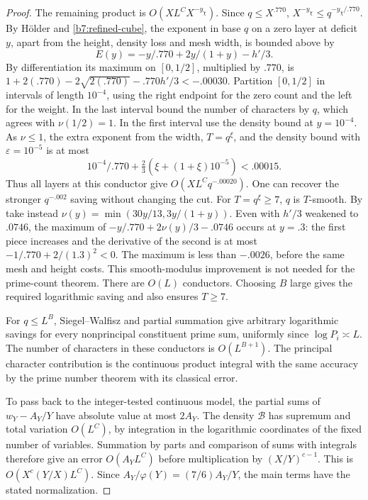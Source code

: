 \documentclass[11pt,a4paper]{article}
\theoremstyle{paperplain}
\numberwithin{equation}{section}
\begin{document}
\begin{proof}
The remaining product is \(O(XL^C X^{-y_\chi})\). Since
\(q\le X^{.770}\), \(X^{-y_\chi}\le q^{-y_\chi/.770}\).
By H\"older and \eqref{b7:refined-cube}, the exponent in
base \(q\) on a zero layer at deficit \(y\), apart from the height,
density loss and mesh width, is bounded above by
\[
 E(y)=-y/.770+2y/(1+y)-h'/3.
\]
By differentiation its maximum on $[0,1/2]$, multiplied by $.770$,
is $1+2(.770)-2\sqrt{2(.770)}-.770h'/3<-.00030$.
Partition \([0,1/2]\) in intervals of length \(10^{-4}\), using
the right endpoint for the zero count and the left for the weight.
In the last interval bound the number of characters by \(q\),
which agrees with \(\nu(1/2)=1\). In the first
interval use the density bound at \(y=10^{-4}\). As \(\nu\le1\),
the extra exponent from the width, \(T=q^\xi\), and the density
bound with \(\varepsilon=10^{-5}\) is at most
\[
 10^{-4}/.770+\tfrac23(\xi+(1+\xi)10^{-5})<.00015 .
\]
Thus all layers at this conductor give \(O(XL^{C}q^{-.00020})\).
One can recover the stronger $q^{-.002}$ saving without changing the
cut. For $T=q^\xi\ge7$, $q$ is $T$-smooth. By
\cite[Theorem~1.2 and (1.4)]{ChenGuptaLi2026} take instead
$\nu(y)=\min(30y/13,3y/(1+y))$. Even with $h'/3$ weakened to
$.0746$, the maximum of $-y/.770+2\nu(y)/3-.0746$ occurs at
$y=.3$: the first piece increases and the derivative of the second
is at most $-1/.770+2/(1.3)^2<0$. The maximum is less than
$-.0026$, before the same mesh and height costs. This smooth-modulus
improvement is not needed for the prime-count theorem.
There are \(O(L)\) conductors. Choosing \(B\) large gives the
required logarithmic saving and also ensures \(T\ge7\).

For \(q\le L^B\), Siegel--Walfisz and partial summation give
arbitrary logarithmic savings for every nonprincipal constituent
prime sum, uniformly since \(\log P_i\asymp L\). The number of
characters in these conductors is \(O(L^{B+1})\). The principal
character contribution is the continuous product integral with the
same accuracy by the prime number theorem with its classical error.

To pass back to the integer-tested continuous model, the partial
sums of \(w_Y-A_Y/Y\) have absolute value at most \(2A_Y\).
The density \(\mathcal B\) has supremum and total variation
\(O(L^C)\), by integration in the logarithmic coordinates of the
fixed number of variables. Summation by parts and comparison of sums
with integrals therefore give an error \(O(A_YL^C)\) before
multiplication by \((X/Y)^{c-1}\). This is
\(O(X^c(Y/X)L^C)\). Since \(A_Y/\varphi(Y)=(7/6)A_Y/Y\),
the main terms have the stated normalization.


\end{proof}
\end{document}
